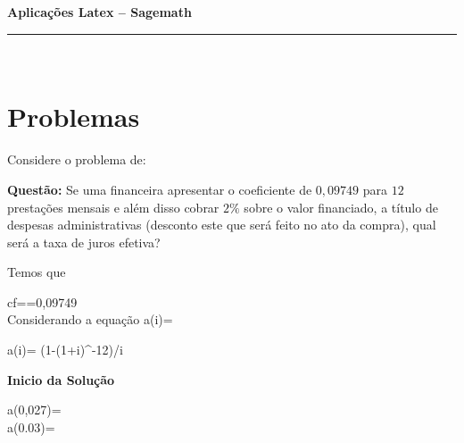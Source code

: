 \documentclass[11pt,a4paper]{article}
\newcommand{\nomer}{\bf Aplicações  Latex -- Sagemath}
\begin{document}
\Large
\large
\begin{center}
\noindent  \nomer
\end{center}
\hfill   %
\hrule\ 
\section*{\sc Problemas}
Considere o problema de\cite{fina2007mathias}:
 


{\bf Questão: }Se uma financeira apresentar o coeficiente de $0,09749$ para $12$ prestações mensais e além disso cobrar $2\%$ sobre o valor financiado, a título de despesas administrativas (desconto este que será feito no ato da compra), qual será a taxa de juros efetiva?

{\sol Temos que}

\ben
cf==0,09749\\
\een
Considerando a equação
\ben
a(i)= 
\een
\begin{sagesilent}
a(i)= (1-(1+i)^-12)/i
\end{sagesilent}


{\bfseries Inicio da  Solução}

\ben
a(0,027)=\\
a(0.03)=\\
\een

\printbibliography
\end{document}
